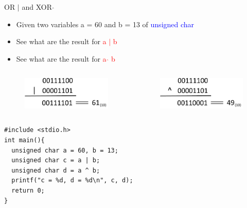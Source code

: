 \begin{frame}[fragile]{OR $|$ and XOR $\hat{}$}
\begin{itemize}
	\item {Given two variables a = 60 and b = 13 of \textcolor{blue}{unsigned char}}
	\item {See what are the result for \textcolor{red}{a $|$ b}}
	\item {See what are the result for \textcolor{red}{a $\hat{}$ b}}
\end{itemize}
\begin{columns}
\begin{column}{0.5\linewidth}
\begin{figure}
\begin{center}
	\includegraphics[width=0.8\linewidth]{figs/or.pdf}
\end{center}
\end{figure}
\end{column}
\begin{column}{0.5\linewidth}
\begin{figure}
\begin{center}
	\includegraphics[width=0.8\linewidth]{figs/xor.pdf}
\end{center}
\end{figure}
\end{column}
\end{columns}
\vspace{0.15in}
\begin{center}
\begin{lstlisting}[linewidth=0.7\linewidth]
#include <stdio.h>
int main(){
  unsigned char a = 60, b = 13;
  unsigned char c = a | b;
  unsigned char d = a ^ b;
  printf("c = %d, d = %d\n", c, d);
  return 0;
}
\end{lstlisting}
\end{center}
\end{frame}


